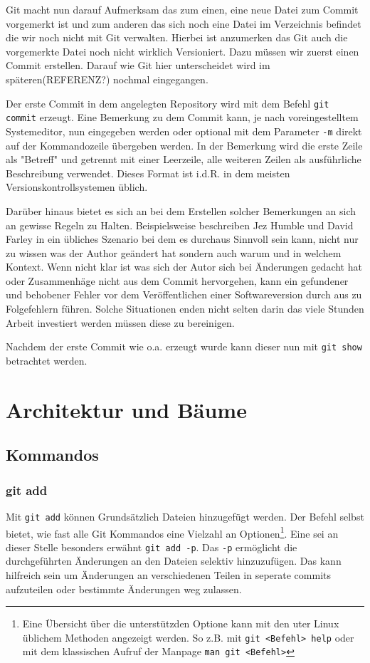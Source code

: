 Git macht nun darauf Aufmerksam das zum einen, eine neue Datei zum Commit
vorgemerkt ist und zum anderen das sich noch eine Datei im Verzeichnis befindet
die wir noch nicht mit Git verwalten. Hierbei ist anzumerken das Git auch die
vorgemerkte Datei noch nicht wirklich Versioniert. Dazu müssen wir zuerst einen
Commit erstellen. Darauf wie Git hier unterscheidet wird im späteren(REFERENZ?)
nochmal eingegangen.

Der erste Commit in dem angelegten Repository wird mit dem Befehl \texttt{git
commit} erzeugt. Eine Bemerkung zu dem Commit kann, je nach voreingestelltem
Systemeditor, nun eingegeben werden oder optional mit dem Parameter \texttt{-m}
direkt auf der Kommandozeile übergeben werden. In der Bemerkung wird die erste
Zeile als "Betreff" und getrennt mit einer Leerzeile, alle weiteren Zeilen als
ausführliche Beschreibung verwendet. Dieses Format ist i.d.R. in dem meisten
Versionskontrollsystemen üblich.

Darüber hinaus bietet es sich an bei dem Erstellen solcher Bemerkungen an sich
an gewisse Regeln zu Halten. Beispielsweise beschreiben Jez Humble und David
Farley in \cite[S.~37]{cd} ein übliches Szenario bei dem es durchaus Sinnvoll
sein kann, nicht nur zu wissen was der Author geändert hat sondern auch warum
und in welchem Kontext. Wenn nicht klar ist was sich der Autor sich bei
Änderungen gedacht hat oder Zusammenhäge nicht aus dem Commit hervorgehen, kann
ein gefundener und behobener Fehler vor dem Veröffentlichen einer
Softwareversion durch aus zu Folgefehlern führen. Solche Situationen enden
nicht selten darin das viele Stunden Arbeit investiert werden müssen diese zu
bereinigen.

Nachdem der erste Commit wie o.a. erzeugt wurde kann dieser nun mit \texttt{git
show} betrachtet werden.



\section{Architektur und Bäume}\label{sec:trees}
\subsection{Kommandos}\label{sec:commands}

\subsubsection{git add}
Mit \texttt{git add} können Grundsätzlich Dateien hinzugefügt werden. Der
Befehl selbst bietet, wie fast alle Git Kommandos eine Vielzahl an
Optionen\footnote{Eine Übersicht über die unterstützden Optione kann mit den
uter Linux üblichem Methoden angezeigt werden. So z.B. mit \texttt{git <Befehl>
help} oder mit dem klassischen Aufruf der Manpage \texttt{man git <Befehl>}}.
Eine sei an dieser Stelle besonders erwähnt \texttt{git add -p}. Das
\texttt{-p} ermöglicht die durchgeführten Änderungen an den Dateien selektiv
hinzuzufügen. Das kann hilfreich sein um Änderungen an verschiedenen Teilen in
seperate \glspl{commit} aufzuteilen oder bestimmte Änderungen weg zulassen.

